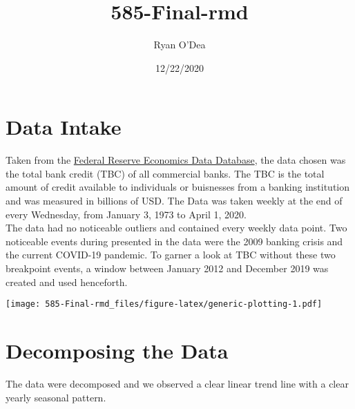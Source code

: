 \documentclass[
]{article}
\title{585-Final-rmd}
\author{Ryan O'Dea}
\date{12/22/2020}
\newenvironment{Shaded}{\begin{snugshade}}{\end{snugshade}}
\newcommand{\DataTypeTok}[1]{\textcolor[rgb]{0.13,0.29,0.53}{#1}}
\newcommand{\KeywordTok}[1]{\textcolor[rgb]{0.13,0.29,0.53}{\textbf{#1}}}
\newcommand{\NormalTok}[1]{#1}
\newcommand{\OperatorTok}[1]{\textcolor[rgb]{0.81,0.36,0.00}{\textbf{#1}}}
\newcommand{\OtherTok}[1]{\textcolor[rgb]{0.56,0.35,0.01}{#1}}
\begin{document}
\maketitle

\begin{Shaded}
\end{Shaded}

\hypertarget{data-intake}{%
\section{Data Intake}\label{data-intake}}

Taken from the \href{https://fred.stlouisfed.org/series/TOTBKCR}{Federal
Reserve Economics Data Database}, the data chosen was the total bank
credit (TBC) of all commercial banks. The TBC is the total amount of
credit available to individuals or buisnesses from a banking institution
and was measured in billions of USD. The Data was taken weekly at the
end of every Wednesday, from January 3, 1973 to April 1, 2020.\\
The data had no noticeable outliers and contained every weekly data
point. Two noticeable events during presented in the data were the 2009
banking crisis and the current COVID-19 pandemic. To garner a look at
TBC without these two breakpoint events, a window between January 2012
and December 2019 was created and used henceforth.

\texttt{[image: 585-Final-rmd\_files/figure-latex/generic-plotting-1.pdf]}

\hypertarget{decomposing-the-data}{%
\section{Decomposing the Data}\label{decomposing-the-data}}

The data were decomposed and we observed a clear linear trend line with
a clear yearly seasonal pattern.
\end{document}
